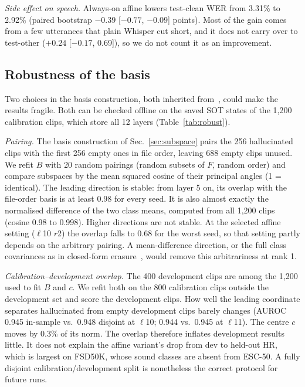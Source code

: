 \documentclass[conference,a4paper]{IEEEtran}
\begin{document}
\emph{Side effect on speech.} Always-on affine lowers test-clean WER from 3.31\% to 2.92\% (paired bootstrap $-0.39$ [$-0.77$, $-0.09$] points). Most of the gain comes from a few utterances that plain Whisper cut short, and it does not carry over to test-other ($+0.24$ [$-0.17$, 0.69]), so we do not count it as an improvement.

\subsection{Robustness of the basis}
\label{sec:robust}
Two choices in the basis construction, both inherited from~\cite{abbasi2026hsp}, could make the results fragile. Both can be checked offline on the saved SOT states of the 1,200 calibration clips, which store all 12 layers (Table~\ref{tab:robust}).

\emph{Pairing.} The basis construction of Sec.~\ref{sec:subspace} pairs the 256 hallucinated clips with the first 256 empty ones in file order, leaving 688 empty clips unused. We refit $B$ with 20 random pairings (random subsets of $F$, random order) and compare subspaces by the mean squared cosine of their principal angles (1 = identical). The leading direction is stable: from layer 5 on, its overlap with the file-order basis is at least 0.98 for every seed. It is also almost exactly the normalised difference of the two class means, computed from all 1,200 clips (cosine 0.98 to 0.998). Higher directions are not stable. At the selected affine setting ($\ell$10 $r$2) the overlap falls to 0.68 for the worst seed, so that setting partly depends on the arbitrary pairing. A mean-difference direction, or the full class covariances as in closed-form erasure~\cite{belrose2023leace}, would remove this arbitrariness at rank 1.

\emph{Calibration--development overlap.} The 400 development clips are among the 1,200 used to fit $B$ and $c$. We refit both on the 800 calibration clips outside the development set and score the development clips. How well the leading coordinate separates hallucinated from empty development clips barely changes (AUROC 0.945 in-sample vs.\ 0.948 disjoint at $\ell$10; 0.944 vs.\ 0.945 at $\ell$11). The centre $c$ moves by 0.3\% of its norm. The overlap therefore inflates development results little. It does not explain the affine variant's drop from dev to held-out HR, which is largest on FSD50K, whose sound classes are absent from ESC-50. A fully disjoint calibration/development split is nonetheless the correct protocol for future runs.
\end{document}
